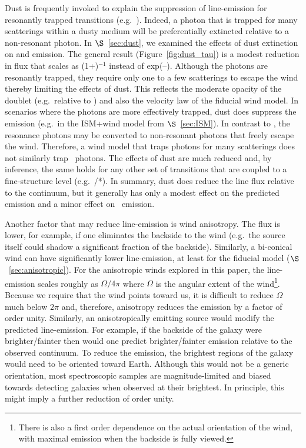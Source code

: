 \documentclass[]{emulateapj}
\begin{document}
Dust is frequently invoked to explain the suppression of line-emission
for resonantly trapped transitions (e.g.\ \lya).  Indeed, a photon
that is trapped for many scatterings within a dusty medium will 
be preferentially extincted relative to a non-resonant photon.  In
$\S$~\ref{sec:dust}, we examined the effects of dust extinction on 
 and  emission.  The general result
(Figure~\ref{fig:dust_tau}) is a modest
reduction in flux that scales as (1+\taud)$^{-1}$ instead of
exp(--\taud). Although the  photons are resonantly
trapped, they require only one to a few scatterings
to escape the wind thereby limiting the effects of
dust.  This reflects the moderate opacity of the 
doublet (e.g.\ relative to \lya) and also the velocity law of the
fiducial wind model.
In scenarios where the  photons are
more effectively trapped, dust does suppress
the emission (e.g.\ in the ISM+wind model from $\S$~\ref{sec:ISM}).
In contrast to , 
the  resonance photons may be
converted to non-resonant photons that freely escape the wind.
Therefore, a wind model that traps 
photons for many scatterings does not similarly trap 
\feiid\ photons.  The effects of dust are much 
reduced and, by inference, the same holds for any other set of
transitions that are coupled to a fine-structure level (e.g.\
/*).  In summary,
dust does reduce the line flux relative to the continuum, but 
it generally has only a modest effect on the predicted 
emission and a minor effect on \feiis\ emission.

Another factor that may reduce line-emission is %
wind %
anisotropy. The flux is lower, for example, if one
eliminates the backside to the wind (e.g.\ the source itself could
shadow a significant fraction of the backside).  
Similarly, a bi-conical
wind can have significantly lower line-emission, at 
least for the fiducial model ($\S$~\ref{sec:anisotropic}). 
For the anisotropic winds explored in this paper,
the line-emission scales 
roughly as $\Omega/4\pi$ where $\Omega$ is the angular extent of the
wind\footnote{There is also a first order dependence on the actual
  orientation of the wind, with maximal emission when the backside is
  fully viewed.}.  Because we require that the wind 
points toward us, it is difficult to reduce $\Omega$ much
below $2 \pi$ and, therefore, anisotropy reduces the
emission by a factor of order unity.  
Similarly, an anisotropically emitting source would modify the predicted
line-emission.  For example, if the backside of the galaxy were
brighter/fainter then would one predict brighter/fainter emission
relative to the observed continuum.
To reduce the emission, the brightest regions
of the galaxy would need to be oriented toward Earth.  Although this
would not be a
generic orientation, most spectroscopic samples are magnitude-limited
and biased towards detecting galaxies when observed at their
brightest.  In principle, this might imply a further
reduction of order unity.
\end{document}
